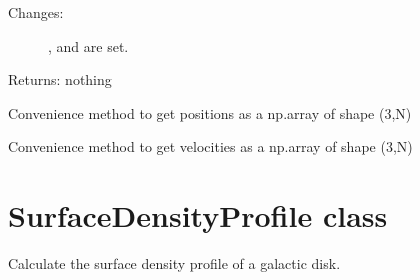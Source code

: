 \documentclass[letterpaper,10pt,english]{sphinxmanual}
\begin{document}
\begin{fulllineitems}
\begin{fulllineitems}
\begin{description}
\begin{description}
\end{description}

\item[{Changes:}] \leavevmode
{},  and  are set.

\end{description}

Returns: nothing

\end{fulllineitems}


\begin{fulllineitems}
\label{\detokenize{approaches:galaxy.approaches.Approaches.xyz}}
Convenience method to get positions as a np.array of shape (3,N)

\end{fulllineitems}


\begin{fulllineitems}
\label{\detokenize{approaches:galaxy.approaches.Approaches.vxyz}}
Convenience method to get velocities as a np.array of shape (3,N)

\end{fulllineitems}


\end{fulllineitems}

\label{\detokenize{surfacedensity:module-galaxy.surfacedensity}}

\chapter{SurfaceDensityProfile class}
\label{\detokenize{surfacedensity:surfacedensityprofile-class}}\label{\detokenize{surfacedensity::doc}}
Calculate the surface density profile of a galactic disk.
\end{document}
